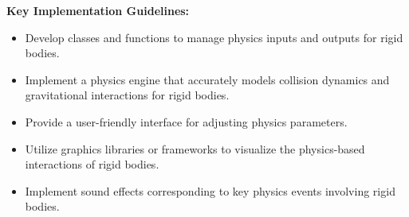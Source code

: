 \documentclass[
]{article}
\begin{document}
\textbf{Key Implementation Guidelines:}

\begin{itemize}
\item
  Develop classes and functions to manage physics inputs and outputs for
  rigid bodies.
\item
  Implement a physics engine that accurately models collision dynamics
  and gravitational interactions for rigid bodies.
\item
  Provide a user-friendly interface for adjusting physics parameters.
\item
  Utilize graphics libraries or frameworks to visualize the
  physics-based interactions of rigid bodies.
\item
  Implement sound effects corresponding to key physics events involving
  rigid bodies.
\end{itemize}
\end{document}
